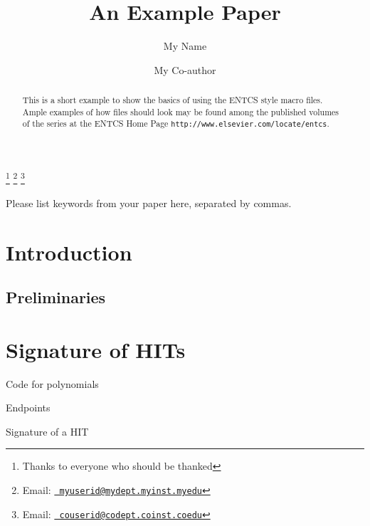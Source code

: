 \documentclass[9pt]{entcs} \usepackage{entcsmacro}
\begin{document}
\begin{frontmatter}
  \title{An Example Paper} \author{My
    Name}
  \address{My Department\\ My University\\
    My City, My Country} \author{My Co-author}
  \address{My Co-author's Department\\My Co-author's University\\
    My Co-author's City, My Co-author's Country} \thanks[ALL]{Thanks
    to everyone who should be thanked} \thanks[myemail]{Email:
    \href{mailto:myuserid@mydept.myinst.myedu} {\texttt{\normalshape
        myuserid@mydept.myinst.myedu}}} \thanks[coemail]{Email:
    \href{mailto:couserid@codept.coinst.coedu} {\texttt{\normalshape
        couserid@codept.coinst.coedu}}}
\begin{abstract} 
  This is a short example to show the basics of using the ENTCS style
  macro files.  Ample examples of how files should look may be found
  among the published volumes of the series at the ENTCS Home Page
  \texttt{http://www.elsevier.com/locate/entcs}.
\end{abstract}
\begin{keyword}
  Please list keywords from your paper here, separated by commas.
\end{keyword}
\end{frontmatter}
\section{Introduction}
\label{intro}

\subsection*{Preliminaries}

\section{Signature of HITs}

\begin{definition}
Code for polynomials
\end{definition}

\begin{definition}
Endpoints
\end{definition}

\begin{definition}
Signature of a HIT
\end{definition}
\end{document}
